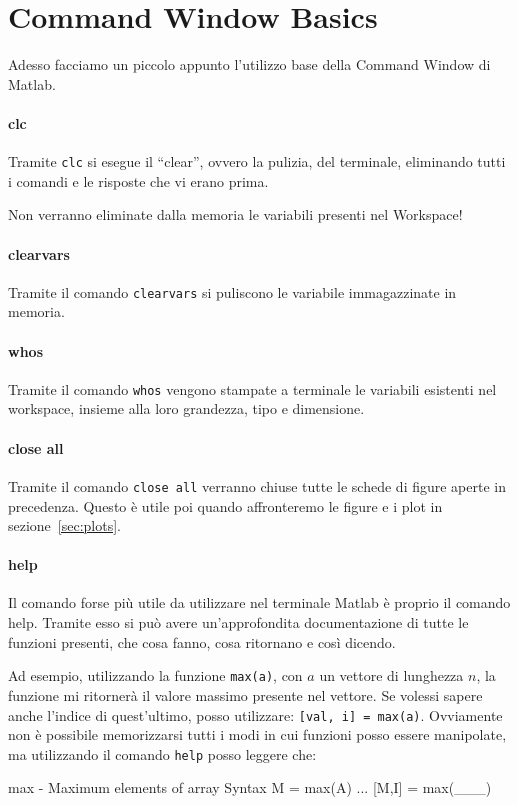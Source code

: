 %

\section{Command Window Basics}
Adesso facciamo un piccolo appunto l'utilizzo base della Command Window di Matlab.

\paragraph{clc} Tramite \verb|clc| si esegue il ``clear'', ovvero la pulizia, del terminale, eliminando tutti i comandi e le risposte che vi erano prima.

\begin{note}
    Non verranno eliminate dalla memoria le variabili presenti nel Workspace!
\end{note}

\paragraph{clearvars} Tramite il comando \verb|clearvars| si puliscono le variabile immagazzinate in memoria.

\paragraph{whos} Tramite il comando \verb|whos| vengono stampate a terminale le variabili esistenti nel workspace, insieme alla loro grandezza, tipo e dimensione.
%
\paragraph{close all} Tramite il comando \verb|close all| verranno chiuse tutte le schede di figure aperte in precedenza. Questo è utile poi quando affronteremo le figure e i plot in sezione~\ref{sec:plots}. %

%
\paragraph{help} Il comando forse più utile da utilizzare nel terminale Matlab è proprio il comando help. Tramite esso si può avere un'approfondita documentazione di tutte le funzioni presenti, che cosa fanno, cosa ritornano e così dicendo.

Ad esempio, utilizzando la funzione \verb|max(a)|, con $ a $ un vettore di lunghezza $ n $, la funzione mi ritornerà il valore massimo presente nel vettore. Se volessi sapere anche l'indice di quest'ultimo, posso utilizzare: \verb|[val, i] = max(a)|. Ovviamente non è possibile memorizzarsi tutti i modi in cui funzioni posso essere manipolate, ma utilizzando il comando \verb|help| posso leggere che:
\begin{matlabconsole}
    max - Maximum elements of array
    Syntax
    M = max(A)
    ...
        [M,I] = max(___)
\end{matlabconsole}

